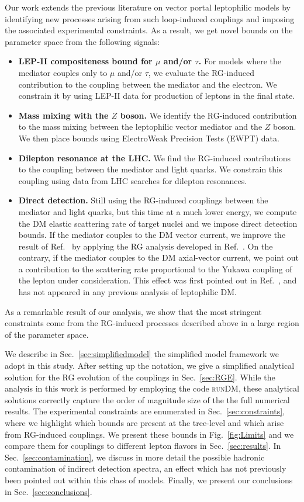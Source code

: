 \documentclass[final,5p,twocolumn]{elsarticle}
\newcommand{\Ref}[1]{Ref.~\cite{#1}}
\newcommand{\runDM}{\textsc{runDM}\xspace}
\begin{document}
Our work extends the previous literature on vector portal leptophilic models by identifying new processes arising from such loop-induced couplings and imposing the associated experimental constraints. As a result, we get novel bounds on the parameter space from the following signals:
\begin{itemize}
\item \textbf{LEP-II compositeness bound for $\mu$ and/or $\tau$.} For models where the mediator couples only to $\mu$ and/or $\tau$, we evaluate the RG-induced contribution to the coupling between the mediator and the electron. We constrain it by using LEP-II data for production of leptons in the final state.
\item \textbf{Mass mixing with the $Z$ boson.} We identify the RG-induced contribution to the mass mixing between the leptophilic vector mediator and the $Z$ boson. We then place bounds using ElectroWeak Precision Tests (EWPT) data.
\item \textbf{Dilepton resonance at the LHC.} We find the RG-induced contributions to the coupling between the mediator and light quarks. We constrain this coupling using data from LHC searches for dilepton resonances. 
\item \textbf{Direct detection.} Still using the RG-induced couplings between the mediator and light quarks, but this time at a much lower energy, we compute the DM elastic scattering rate of target nuclei and we impose direct detection bounds. If the mediator couples to the DM vector current, we improve the result of \Ref{Kopp:2009et} by applying the RG analysis developed in \Ref{D'Eramo:2014aba}. On the contrary, if the mediator couples to the DM axial-vector current, we point out a contribution to the scattering rate proportional to the Yukawa coupling of the lepton under consideration. This effect was first pointed out in \Ref{D'Eramo:2014aba}, and has not appeared in any previous analysis of leptophilic DM.
\end{itemize}
As a remarkable result of our analysis, we show that the most stringent constraints come from the RG-induced processes described above in a large region of the parameter space. 

We describe in Sec.~\ref{sec:simplifiedmodel} the simplified model framework we adopt in this study. After setting up the notation, we give a simplified analytical solution for the RG evolution of the couplings in Sec.~\ref{sec:RGE}. While the analysis in this work is performed by employing the code \runDM, these analytical solutions correctly capture the order of magnitude size of the the full numerical results. The experimental constraints are enumerated in Sec.~\ref{sec:constraints}, where we highlight which bounds are present at the tree-level and which arise from RG-induced couplings. We present these bounds in Fig.~\ref{fig:Limits} and we compare them for couplings to different lepton flavors in Sec.~\ref{sec:results}. In Sec.~\ref{sec:contamination}, we discuss in more detail the possible hadronic contamination of indirect detection spectra, an effect which has not previously been pointed out within this class of models. Finally, we present our conclusions in Sec.~\ref{sec:conclusions}.
\end{document}
